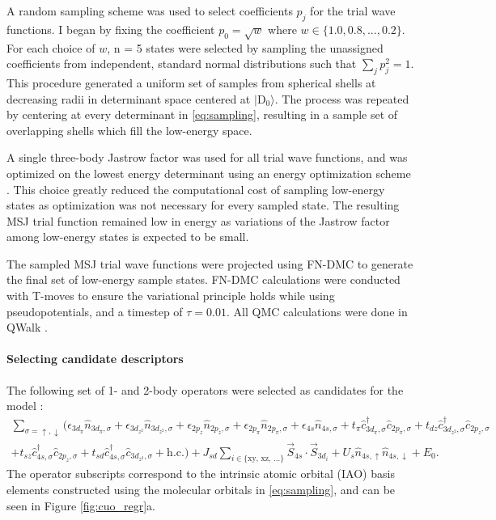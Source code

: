 \documentclass[12pt]{article}
\begin{document}
A random sampling scheme was used to select coefficients $p_j$ for the trial wave functions.
I began by fixing the coefficient $p_0 = \sqrt{w}$ where $w \in \{1.0, 0.8, ..., 0.2\}$. 
For each choice of $w$, n = 5 states were selected by sampling the unassigned coefficients from independent, standard normal distributions such that $\sum_j p_j^2 = 1$. 
This procedure generated a uniform set of samples from spherical shells at decreasing radii in determinant space centered at $|\text{D}_0\rangle$.
The process was repeated by centering at every determinant in \eqref{eq:sampling}, resulting in a sample set of overlapping shells which fill the low-energy space.

A single three-body Jastrow factor was used for all trial wave functions, and was optimized on the lowest energy determinant using an energy optimization scheme \cite{Toulouse2007}.
This choice greatly reduced the computational cost of sampling low-energy states as optimization was not necessary for every sampled state.
The resulting MSJ trial function remained low in energy as variations of the Jastrow factor among low-energy states is expected to be small.

The sampled MSJ trial wave functions were projected using FN-DMC to generate the final set of low-energy sample states.
FN-DMC calculations were conducted with T-moves \cite{PhysRevB.74.161102} to ensure the variational principle holds while using pseudopotentials, and a timestep of $\tau = 0.01$.
All QMC calculations were done in QWalk \cite{Wagner2009}.

\vspace{-10pt}
\paragraph{Selecting candidate descriptors}
The following set of 1- and 2-body operators were selected as candidates for the model :
\begin{equation}
\begin{split}
\sum_{\sigma = \uparrow, \downarrow} \Bigg(\epsilon_{3d_\pi}\hat{n}_{3d_\pi,\sigma} + \epsilon_{3d_{z^2}}\hat{n}_{3d_{z^2},\sigma} +  \epsilon_{2p_z} \hat{n}_{2p_z,\sigma} + \epsilon_{2p_\pi}\hat{n}_{2p_\pi,\sigma} + \epsilon_{4s}\hat{n}_{4s,\sigma} +
t_\pi \hat{c}_{3d_\pi,\sigma}^\dagger \hat{c}_{2p_\pi,\sigma} + t_{dz} \hat{c}_{3d_{z^2},\sigma}^\dagger \hat{c}_{2p_z,\sigma}\\
  + t_{sz}\hat{c}_{4s,\sigma}^\dagger \hat{c}_{2p_z,\sigma} + t_{sd}\hat{c}_{4s,\sigma}^\dagger \hat{c}_{3d_{z^2},\sigma} + \text{h.c.} \Bigg)  +
J_{sd}\sum_{i\in {\{\text{xy, xz, ...}}\}} \vec{S}_{4s} \cdot \vec{S}_{3d_i} + U_s \hat{n}_{4s,\uparrow}\hat{n}_{4s,\downarrow} + E_0.
\end{split}
\label{eq:models}
\end{equation}
The operator subscripts correspond to the intrinsic atomic orbital (IAO) basis elements constructed using the molecular orbitals in \eqref{eq:sampling}, and can be seen in Figure \ref{fig:cuo_regr}a.
\end{document}
